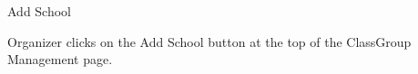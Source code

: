 
\begin{uc}{Add School}


    \begin{uc-trig}
        Organizer clicks on the Add School button at the top of the ClassGroup Management
        page.
    \end{uc-trig}

\end{uc}

